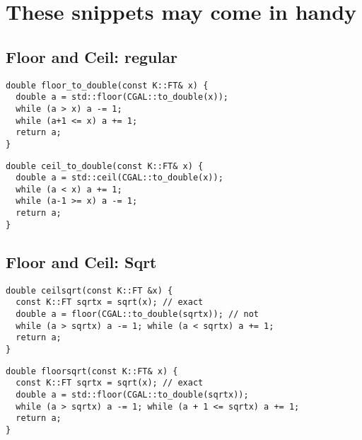 \documentclass[guide.tex]{subfiles}
\begin{document}
\section{These snippets may come in handy}

\subsection{Floor and Ceil: regular}
\begin{verbatim}
double floor_to_double(const K::FT& x) {
  double a = std::floor(CGAL::to_double(x));
  while (a > x) a -= 1;
  while (a+1 <= x) a += 1;
  return a;
}
\end{verbatim}

\begin{verbatim}
double ceil_to_double(const K::FT& x) {
  double a = std::ceil(CGAL::to_double(x));
  while (a < x) a += 1;
  while (a-1 >= x) a -= 1;
  return a;
}
\end{verbatim}

\subsection{Floor and Ceil: Sqrt}
\begin{verbatim}
double ceilsqrt(const K::FT &x) {
  const K::FT sqrtx = sqrt(x); // exact
  double a = floor(CGAL::to_double(sqrtx)); // not
  while (a > sqrtx) a -= 1; while (a < sqrtx) a += 1;
  return a;
}
\end{verbatim}

\begin{verbatim}
double floorsqrt(const K::FT& x) {
  const K::FT sqrtx = sqrt(x); // exact
  double a = std::floor(CGAL::to_double(sqrtx));
  while (a > sqrtx) a -= 1; while (a + 1 <= sqrtx) a += 1;
  return a;
}
\end{verbatim}


\begin{verbatim}

\end{verbatim}


\begin{verbatim}

\end{verbatim}
\end{document}
